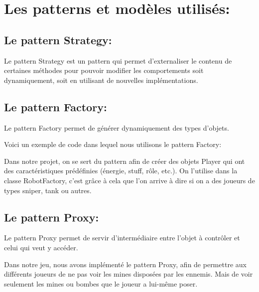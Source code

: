 \documentclass{article}
\begin{document}
\section{Les patterns et modèles utilisés:}

\subsection{Le pattern Strategy:}


Le pattern Strategy est un pattern qui permet d'externaliser le contenu de certaines méthodes pour pouvoir modifier les comportements soit dynamiquement, soit en utilisant de nouvelles implémentations.


\subsection{Le pattern Factory:}

Le pattern Factory permet de générer dynamiquement des types d'objets.

Voici un exemple de code dans lequel nous utilisons le pattern Factory:




\vspace{0.3\baselineskip}

Dans notre projet, on se sert du pattern afin de créer des objets Player qui ont des caractéristiques prédéfinies (énergie, stuff, rôle, etc.).
On l'utilise dans la classe RobotFactory, c'est grâce à cela que l'on arrive à dire si on a des joueurs de types sniper, tank ou autres.

\vspace{1\baselineskip}




\vspace{1\baselineskip}

\subsection{Le pattern Proxy:}

Le pattern Proxy permet de servir d'intermédiaire entre l'objet à contrôler et celui qui veut y accéder.

\vspace{1\baselineskip}

Dans notre jeu, nous avons implémenté le pattern Proxy, afin de permettre aux différents joueurs de ne pas voir les mines disposées par les ennemis. Mais de voir seulement les mines ou bombes que le joueur a lui-même poser.
\end{document}
